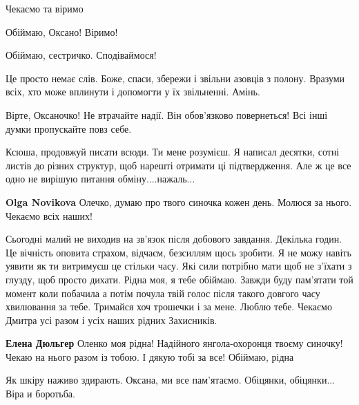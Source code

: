 
Чекаємо та віримо 🙏


Обіймаю, Оксано! Віримо!


Обіймаю, сестричко. Сподіваймося!


Це просто немає слів. Боже, спаси, збережи і звільни азовців з полону. Вразуми
всіх, хто може вплинути і допомогти у їх звільненні. Амінь.


Вірте, Оксаночко! Не втрачайте надії. Він обов'язково повернеться! Всі інші
думки пропускайте повз себе.


Ксюша, продовжуй писати всюди. Ти мене розумієш. Я написал десятки, сотні
листів до різних структур, щоб нарешті отримати ці підтвердження. Але ж це все
одно не вирішую питання обміну....нажаль...

\begin{itemize} %
\textbf{Olga Novikova} Олечко, думаю про твого синочка кожен день. Молюся за нього. Чекаємо всіх наших!
\end{itemize} %


Сьогодні малий не виходив на зв'язок після добового завдання. Декілька годин.
Це вічність оповита страхом, відчаєм, безсиллям щось зробити. Я не можу навіть
уявити як ти витримуєш це стільки часу. Які сили потрібно мати щоб не з'їхати з
глузду, щоб просто дихати. Рідна моя, я тебе обіймаю. Завжди буду пам'ятати той
момент коли побачила а потім почула твій голос після такого довгого часу
хвилювання за тебе. Тримайся хоч трошечки і за мене. Люблю тебе. Чекаємо Дмитра
усі разом і усіх наших рідних Захисників.

\begin{itemize} %
\textbf{Елена Дюльгер} Оленко моя рідна! Надійного янгола-охоронця твоєму синочку! Чекаю на нього разом із тобою. І дякую тобі за все! Обіймаю, рідна
\end{itemize} %


Як шкіру наживо здирають. Оксана, ми все пам'ятаємо. Обіцянки, обіцянки... Віра и боротьба.


